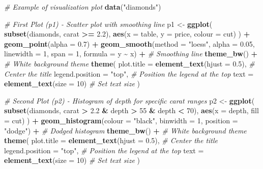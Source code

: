 \documentclass[
  12pt,
]{article}
\newenvironment{Shaded}{\begin{snugshade}}{\end{snugshade}}
\newcommand{\AttributeTok}[1]{\textcolor[rgb]{0.13,0.29,0.53}{#1}}
\newcommand{\CommentTok}[1]{\textcolor[rgb]{0.56,0.35,0.01}{\textit{#1}}}
\newcommand{\DecValTok}[1]{\textcolor[rgb]{0.00,0.00,0.81}{#1}}
\newcommand{\FloatTok}[1]{\textcolor[rgb]{0.00,0.00,0.81}{#1}}
\newcommand{\FunctionTok}[1]{\textcolor[rgb]{0.13,0.29,0.53}{\textbf{#1}}}
\newcommand{\NormalTok}[1]{#1}
\newcommand{\OtherTok}[1]{\textcolor[rgb]{0.56,0.35,0.01}{#1}}
\newcommand{\SpecialCharTok}[1]{\textcolor[rgb]{0.81,0.36,0.00}{\textbf{#1}}}
\newcommand{\StringTok}[1]{\textcolor[rgb]{0.31,0.60,0.02}{#1}}
\begin{document}
\begin{Shaded}
\begin{Highlighting}[]
\CommentTok{\# Example of visualization plot}
\FunctionTok{data}\NormalTok{(}\StringTok{"diamonds"}\NormalTok{)}

\CommentTok{\# First Plot (p1) {-} Scatter plot with smoothing line}
\NormalTok{p1 }\OtherTok{\textless{}{-}} \FunctionTok{ggplot}\NormalTok{(}
  \FunctionTok{subset}\NormalTok{(diamonds, carat }\SpecialCharTok{\textgreater{}=} \FloatTok{2.2}\NormalTok{),}
  \FunctionTok{aes}\NormalTok{(}\AttributeTok{x =}\NormalTok{ table, }\AttributeTok{y =}\NormalTok{ price, }\AttributeTok{colour =}\NormalTok{ cut)}
\NormalTok{) }\SpecialCharTok{+}
  \FunctionTok{geom\_point}\NormalTok{(}\AttributeTok{alpha =} \FloatTok{0.7}\NormalTok{) }\SpecialCharTok{+}  
  \FunctionTok{geom\_smooth}\NormalTok{(}\AttributeTok{method =} \StringTok{"loess"}\NormalTok{, }\AttributeTok{alpha =} \FloatTok{0.05}\NormalTok{,}
  \AttributeTok{linewidth =} \DecValTok{1}\NormalTok{, }\AttributeTok{span =} \DecValTok{1}\NormalTok{, }\AttributeTok{formula =}\NormalTok{ y }\SpecialCharTok{\textasciitilde{}}\NormalTok{ x) }\SpecialCharTok{+}  \CommentTok{\# Smoothing line}
  \FunctionTok{theme\_bw}\NormalTok{() }\SpecialCharTok{+}  \CommentTok{\# White background theme}
  \FunctionTok{theme}\NormalTok{(}
    \AttributeTok{plot.title =} \FunctionTok{element\_text}\NormalTok{(}\AttributeTok{hjust =} \FloatTok{0.5}\NormalTok{),  }\CommentTok{\# Center the title}
    \AttributeTok{legend.position =} \StringTok{"top"}\NormalTok{,  }\CommentTok{\# Position the legend at the top}
    \AttributeTok{text =} \FunctionTok{element\_text}\NormalTok{(}\AttributeTok{size =} \DecValTok{10}\NormalTok{)  }\CommentTok{\# Set text size}
\NormalTok{  )}

\CommentTok{\# Second Plot (p2) {-} Histogram of depth for specific carat ranges}
\NormalTok{p2 }\OtherTok{\textless{}{-}} \FunctionTok{ggplot}\NormalTok{(}
  \FunctionTok{subset}\NormalTok{(diamonds, carat }\SpecialCharTok{\textgreater{}} \FloatTok{2.2} \SpecialCharTok{\&}\NormalTok{ depth }\SpecialCharTok{\textgreater{}} \DecValTok{55} \SpecialCharTok{\&}\NormalTok{ depth }\SpecialCharTok{\textless{}} \DecValTok{70}\NormalTok{),}
  \FunctionTok{aes}\NormalTok{(}\AttributeTok{x =}\NormalTok{ depth, }\AttributeTok{fill =}\NormalTok{ cut)}
\NormalTok{) }\SpecialCharTok{+}
  \FunctionTok{geom\_histogram}\NormalTok{(}\AttributeTok{colour =} \StringTok{"black"}\NormalTok{,}
  \AttributeTok{binwidth =} \DecValTok{1}\NormalTok{, }\AttributeTok{position =} \StringTok{"dodge"}\NormalTok{) }\SpecialCharTok{+}  \CommentTok{\# Dodged histogram}
  \FunctionTok{theme\_bw}\NormalTok{() }\SpecialCharTok{+}  \CommentTok{\# White background theme}
  \FunctionTok{theme}\NormalTok{(}
    \AttributeTok{plot.title =} \FunctionTok{element\_text}\NormalTok{(}\AttributeTok{hjust =} \FloatTok{0.5}\NormalTok{),  }\CommentTok{\# Center the title}
    \AttributeTok{legend.position =} \StringTok{"top"}\NormalTok{,  }\CommentTok{\# Position the legend at the top}
    \AttributeTok{text =} \FunctionTok{element\_text}\NormalTok{(}\AttributeTok{size =} \DecValTok{10}\NormalTok{)  }\CommentTok{\# Set text size}
\NormalTok{  )}


\end{Highlighting}
\end{Shaded}
\end{document}
